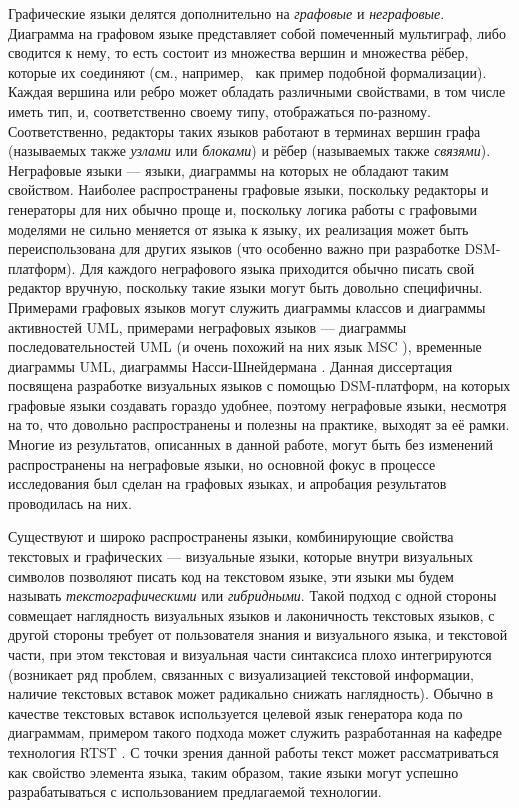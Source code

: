 Графические языки делятся дополнительно на \textit{графовые} и \textit{неграфовые}. Диаграмма на 
графовом языке представляет собой помеченный мультиграф, либо сводится к нему, то 
есть состоит из множества вершин и множества рёбер, которые их соединяют (см., например,~\cite{sukhov2013disser}
как пример подобной формализации). Каждая вершина или ребро может обладать различными свойствами, в том числе иметь 
тип, и, соответственно своему типу, отображаться по-разному. Соответственно,
 редакторы таких языков работают в терминах вершин графа (называемых также 
\textit{узлами} или \textit{блоками}) и рёбер (называемых также \textit{связями}). Неграфовые языки --- 
языки, диаграммы на которых не обладают таким свойством. Наиболее распространены 
графовые языки, поскольку редакторы и генераторы для них обычно проще и, 
поскольку логика работы с графовыми моделями не сильно меняется от языка к 
языку, их реализация может быть переиспользована для других языков (что особенно 
важно при разработке DSM-платформ). Для каждого неграфового языка приходится 
обычно писать свой редактор вручную, поскольку такие языки могут быть довольно 
специфичны. Примерами графовых языков могут служить диаграммы классов и 
диаграммы активностей \ac{UML}, примерами неграфовых языков --- диаграммы 
последовательностей \ac{UML} (и очень похожий на них язык MSC%
), временные диаграммы \ac{UML}, диаграммы Насси-Шнейдермана%
. Данная диссертация посвящена разработке визуальных языков с помощью 
DSM-платформ, на которых графовые языки создавать гораздо удобнее, поэтому 
неграфовые языки, несмотря на то, что довольно распространены и полезны на 
практике, выходят за её рамки. Многие из результатов, описанных в данной работе, могут 
быть без изменений распространены на неграфовые языки, но основной фокус в процессе 
исследования был сделан на графовых языках, и апробация результатов проводилась на них.

Существуют и широко распространены языки, комбинирующие свойства текстовых и 
графических --- визуальные языки, которые внутри визуальных символов позволяют 
писать код на текстовом языке, эти языки мы будем называть \textit{текстографическими} или \textit{гибридными}. 
Такой подход с одной стороны совмещает наглядность визуальных языков и лаконичность текстовых языков, с другой стороны 
требует от пользователя знания и визуального языка, и текстовой части, при этом 
текстовая и визуальная части синтаксиса плохо интегрируются (возникает ряд 
проблем, связанных с визуализацией текстовой информации, наличие текстовых
вставок может радикально снижать наглядность). Обычно в качестве текстовых 
вставок используется целевой язык генератора кода по диаграммам, примером такого 
подхода может служить разработанная на кафедре технология RTST%
. С точки зрения данной работы текст может рассматриваться как свойство элемента 
языка, таким образом, такие языки могут успешно разрабатываться с использованием 
предлагаемой технологии.

